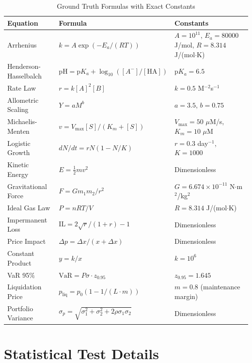 \documentclass[twoside,11pt]{article}
\begin{document}
\begin{table}[H]
\centering
\caption{Ground Truth Formulas with Exact Constants}
\label{tab:formulas_detailed}
\scriptsize
\begin{tabular}{lll}
\toprule
\textbf{Equation} & \textbf{Formula} & \textbf{Constants} \\
\midrule
Arrhenius & $k = A\exp(-E_a/(RT))$ & $A=10^{11}$, $E_a=80000$ J/mol, $R=8.314$ J/(mol$\cdot$K) \\
Henderson-Hasselbalch & $\text{pH} = \text{p}K_a + \log_{10}([A^-]/[\text{HA}])$ & $\text{p}K_a = 6.5$ \\
Rate Law & $r = k[A]^2[B]$ & $k = 0.5$ M$^{-2}$s$^{-1}$ \\
Allometric Scaling & $Y = aM^b$ & $a = 3.5$, $b = 0.75$ \\
Michaelis-Menten & $v = V_{\max}[S]/(K_m + [S])$ & $V_{\max} = 50$ $\mu$M/s, $K_m = 10$ $\mu$M \\
Logistic Growth & $dN/dt = rN(1-N/K)$ & $r = 0.3$ day$^{-1}$, $K = 1000$ \\
Kinetic Energy & $E = \frac{1}{2}mv^2$ & Dimensionless \\
Gravitational Force & $F = Gm_1m_2/r^2$ & $G = 6.674 \times 10^{-11}$ N$\cdot$m$^2$/kg$^2$ \\
Ideal Gas Law & $P = nRT/V$ & $R = 8.314$ J/(mol$\cdot$K) \\
Impermanent Loss & $\text{IL} = 2\sqrt{r}/(1+r) - 1$ & Dimensionless \\
Price Impact & $\Delta p = \Delta x/(x + \Delta x)$ & Dimensionless \\
Constant Product & $y = k/x$ & $k = 10^6$ \\
VaR 95\% & $\text{VaR} = P\sigma \cdot z_{0.95}$ & $z_{0.95} = 1.645$ \\
Liquidation Price & $p_{\text{liq}} = p_0(1 - 1/(L \cdot m))$ & $m = 0.8$ (maintenance margin) \\
Portfolio Variance & $\sigma_p = \sqrt{\sigma_1^2 + \sigma_2^2 + 2\rho\sigma_1\sigma_2}$ & Dimensionless \\
\bottomrule
\end{tabular}
\end{table}



\section{Statistical Test Details}
\label{app:statistical_tests}
\end{document}
